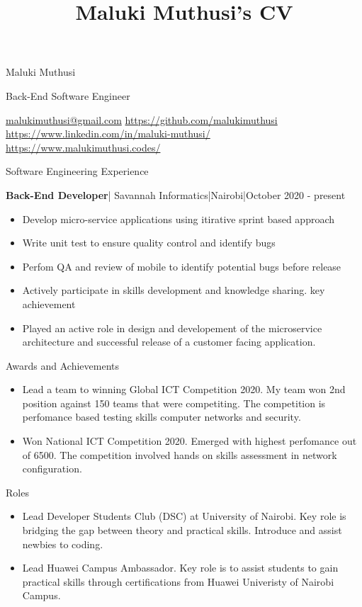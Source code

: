 \documentclass[a4paper]{article}
\begin{document}
\title{Maluki Muthusi's CV}

\begin{center}
    Maluki Muthusi \par
    Back-End Software Engineer
\end{center}
\href{mailto:malukimuthusi@gmail.com}{malukimuthusi@gmail.com}
\url{https://github.com/malukimuthusi}
\url{https://www.linkedin.com/in/maluki-muthusi/}
\url{https://www.malukimuthusi.codes/}

\begin{center}
    Software Engineering Experience
\end{center}
\textbf{Back-End Developer}| Savannah Informatics|Nairobi|October 2020 - present
\begin{itemize}
    \item Develop micro-service applications using itirative sprint based approach
    \item Write unit test to ensure quality control and identify bugs
    \item Perfom QA and review of mobile to identify potential bugs before release
    \item Actively participate in skills development and knowledge sharing.
              {\centering key achievement}
    \item Played an active role in design and developement of the microservice architecture and successful release of a customer facing application.
\end{itemize}

{\centering Awards and Achievements}
\begin{itemize}
    \item Lead a team to winning Global ICT Competition 2020. My team won 2nd position against 150 teams that were competiting. The competition is perfomance based testing skills computer networks and security.
    \item Won National ICT Competition 2020. Emerged with highest perfomance out of 6500. The competition involved hands on skills assessment in network configuration.
\end{itemize}

{\centering Roles}
\begin{itemize}
    \item Lead Developer Students Club (DSC) at University of Nairobi. Key role is bridging the gap between theory and practical skills. Introduce and assist newbies to coding.
    \item Lead Huawei Campus Ambassador. Key role is to assist students to gain practical skills through certifications from Huawei Univeristy of Nairobi Campus.
\end{itemize}
\end{document}
